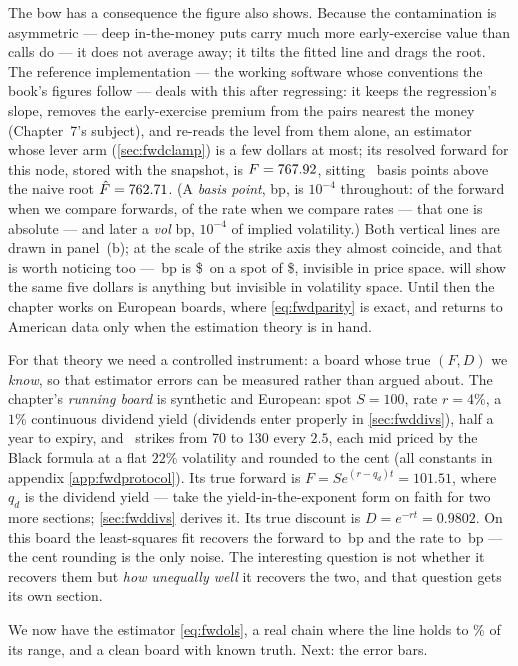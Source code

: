 The bow has a consequence the figure also shows.  Because the
contamination is asymmetric --- deep in-the-money puts carry much more
early-exercise value than calls do --- it does not average away; it
tilts the fitted line and drags the root.  The reference
implementation --- the working software whose conventions the book's
figures follow --- deals with this after regressing: it keeps the
regression's slope, removes the early-exercise premium from the pairs
nearest the money (Chapter~7's subject), and re-reads the level from
them alone, an estimator whose lever arm (\cref{sec:fwdclamp}) is a
few dollars at most; its resolved forward for
this node, stored with the snapshot, is $F=767.92$,
sitting \MacFwdLineGapBp\ basis points above the naive root
$\hat F=762.71$.  (A \emph{basis point}, bp, is $10^{-4}$
throughout: of the forward when we compare forwards, of the rate when
we compare rates --- that one is absolute --- and later a \emph{vol}
bp, $10^{-4}$ of implied volatility.)  Both vertical lines are drawn in
panel~(b); at the scale of the strike axis they almost coincide, and
that is worth noticing too --- \MacFwdLineGapBp\,bp is
\$\MacFwdLineGapDollars\ on a spot of \$\MacFwdLineSpotDollars,
invisible in price space.
 will show the same five dollars is anything but
invisible in volatility space.  Until then the chapter works on
European boards, where \eqref{eq:fwdparity} is exact, and returns to
American data only when the estimation theory is in hand.

For that theory we need a controlled instrument: a board whose true
$(F,D)$ we \emph{know}, so that estimator errors can be measured
rather than argued about.  The chapter's \emph{running board} is
synthetic and European: spot $S=100$, rate $r=4\%$, a $1\%$ continuous
dividend yield (dividends enter properly in \cref{sec:fwddivs}), half
a year to expiry, and \MacFwdIdentNStrikes\ strikes from 70 to 130
every $2.5$, each mid priced by the Black formula at a flat $22\%$
volatility and rounded to the cent (all constants in appendix
\ref{app:fwdprotocol}).  Its true forward is
$F=Se^{(r-q_d)t}=101.51$, where $q_d$ is the dividend yield --- take
the yield-in-the-exponent form on faith for two more sections;
\cref{sec:fwddivs} derives it.  Its true discount is
$D=e^{-rt}=0.9802$.  On this board the least-squares fit recovers the
forward to \MacFwdIdentCleanFwdErrBp\,bp and the rate to
\MacFwdIdentCleanRateErrBp\,bp --- the cent rounding is the only
noise.  The interesting question is not whether it recovers
them but \emph{how unequally well} it recovers the two, and that
question gets its own section.

We now have the estimator \eqref{eq:fwdols}, a real chain where the
line holds to \MacFwdLineStraightPct\% of its range, and a clean board with known
truth.  Next: the error bars.

